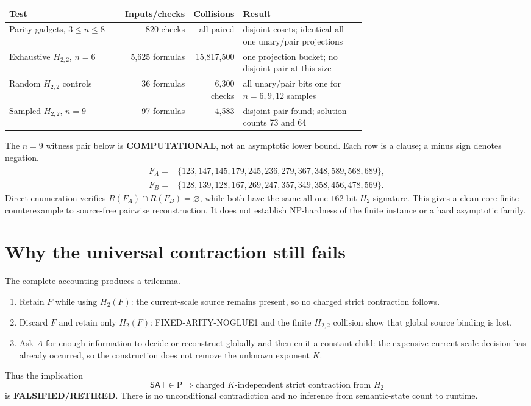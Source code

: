 \documentclass[11pt]{article}
\newcommand{\SAT}{\mathsf{SAT}}
\newcommand{\status}[1]{\textbf{#1}}
\begin{document}
\begin{center}
\begin{tabular}{@{}p{0.33\linewidth}rrp{0.35\linewidth}@{}}
\toprule
Test & Inputs/checks & Collisions & Result\\
\midrule
Parity gadgets, $3\le n\le8$ & 820 checks & all paired & disjoint cosets; identical all-one unary/pair projections\\
Exhaustive $H_{2,2}$, $n=6$ & 5,625 formulas & 15,817,500 & one projection bucket; no disjoint pair at this size\\
Random $H_{2,2}$ controls & 36 formulas & 6,300 checks & all unary/pair bits one for $n=6,9,12$ samples\\
Sampled $H_{2,2}$, $n=9$ & 97 formulas & 4,583 & disjoint pair found; solution counts 73 and 64\\
\bottomrule
\end{tabular}
\end{center}

The $n=9$ witness pair below is \status{COMPUTATIONAL}, not an asymptotic lower bound.  Each row is a clause; a minus sign denotes negation.
\begin{align*}
F_A={}&\{123,147,\bar1\bar4\bar5,\bar1\bar7\bar9,245,
\bar2\bar3\bar6,\bar2\bar7\bar9,367,\bar3\bar4\bar8,589,
\bar5\bar6\bar8,689\},\\
F_B={}&\{128,139,\bar1\bar2\bar8,\bar1\bar6\bar7,269,
\bar2\bar4\bar7,357,\bar3\bar4\bar9,\bar3\bar5\bar8,456,
478,\bar5\bar6\bar9\}.
\end{align*}
Direct enumeration verifies $R(F_A)\cap R(F_B)=\varnothing$, while both have the same all-one $162$-bit $H_2$ signature.  This gives a clean-core finite counterexample to source-free pairwise reconstruction.  It does not establish NP-hardness of the finite instance or a hard asymptotic family.

\section{Why the universal contraction still fails}
The complete accounting produces a trilemma.
\begin{enumerate}[leftmargin=2em]
\item Retain $F$ while using $H_2(F)$: the current-scale source remains present, so no charged strict contraction follows.
\item Discard $F$ and retain only $H_2(F)$: FIXED-ARITY-NOGLUE1 and the finite $H_{2,2}$ collision show that global source binding is lost.
\item Ask $A$ for enough information to decide or reconstruct globally and then emit a constant child: the expensive current-scale decision has already occurred, so the construction does not remove the unknown exponent $K$.
\end{enumerate}
Thus the implication
\[
\SAT\in\mathrm P\Longrightarrow\text{charged $K$-independent strict contraction from }H_2
\]
is \status{FALSIFIED/RETIRED}.  There is no unconditional contradiction and no inference from semantic-state count to runtime.
\end{document}
